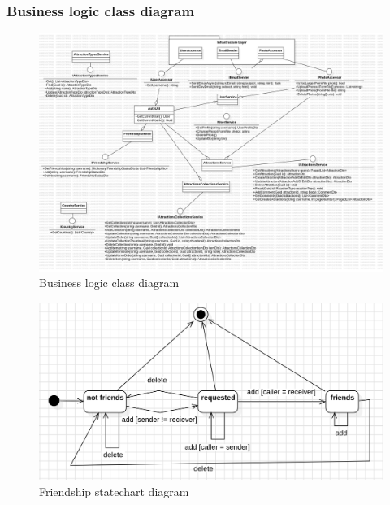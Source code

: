 \subsubsection{Business logic class diagram}

\begin{figure}[!ht]
    \centering
    \includegraphics[width=1\linewidth]{business-class-diagram.png}
    \caption{Business logic class diagram}
    \label{fig:enter-label}
\end{figure}

\begin{figure}
    \centering
    \includegraphics[width=1\linewidth]{friendship-statechartdiagram.png}
    \caption{Friendship statechart diagram}
    \label{fig:enter-label}
\end{figure}

